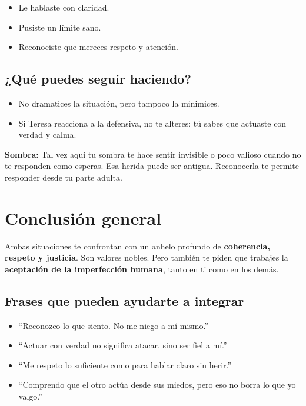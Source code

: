 \documentclass[12pt]{article}
\begin{document}
	\begin{itemize}
		\item Le hablaste con claridad.
		\item Pusiste un límite sano.
		\item Reconociste que mereces respeto y atención.
	\end{itemize}
	
	\subsection*{¿Qué puedes seguir haciendo?}
	
	\begin{itemize}
		\item No dramatices la situación, pero tampoco la minimices.
		\item Si Teresa reacciona a la defensiva, no te alteres: tú sabes que actuaste con verdad y calma.
	\end{itemize}
	
	\textbf{Sombra:} Tal vez aquí tu sombra te hace sentir invisible o poco valioso cuando no te responden como esperas. Esa herida puede ser antigua. Reconocerla te permite responder desde tu parte adulta.
	
	\section{Conclusión general}
	
	Ambas situaciones te confrontan con un anhelo profundo de \textbf{coherencia, respeto y justicia}. Son valores nobles. Pero también te piden que trabajes la \textbf{aceptación de la imperfección humana}, tanto en ti como en los demás.
	
	\subsection*{Frases que pueden ayudarte a integrar}
	
	\begin{itemize}
		\item ``Reconozco lo que siento. No me niego a mí mismo.''
		\item ``Actuar con verdad no significa atacar, sino ser fiel a mí.''
		\item ``Me respeto lo suficiente como para hablar claro sin herir.''
		\item ``Comprendo que el otro actúa desde sus miedos, pero eso no borra lo que yo valgo.''
	\end{itemize}
	
\end{document}
